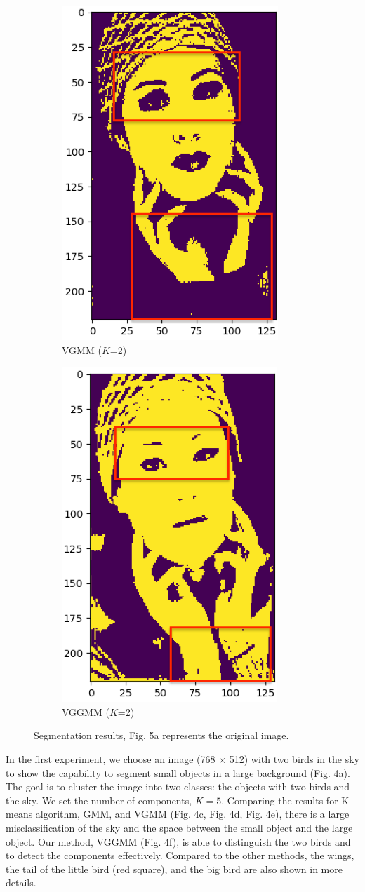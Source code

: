 \documentclass[conference]{IEEEtran}
\begin{document}
\begin{figure}
    \centering
    \begin{subfigure}{.5\linewidth}
        \centering
        \includegraphics[height=0.7\textwidth]{imgresults/face_vgm.png}
        \caption{VGMM ($K$=2)}
        \label{fig:sub1}
    \end{subfigure}%
    \begin{subfigure}{.5\linewidth}
        \centering
        \includegraphics[height=0.7\textwidth]{imgresults/face_vggmm.png}
        \caption{VGGMM ($K$=2)}
        \label{fig:sub2}
    \end{subfigure}
    \caption{Segmentation results, Fig. 5a represents the original image.}
    \label{fig:crow}
\end{figure}
In the first experiment, we choose an image (768 × 512) with two birds in the sky to show the capability to segment small objects in a large background (Fig. 4a). 
The goal is to cluster the image into two classes: the objects with two birds and the sky. 
We set the number of components, $K= 5$.
Comparing the results for K-means algorithm, GMM, and VGMM (Fig. 4c, Fig. 4d, Fig. 4e), there is a large misclassification of the sky and the space between the small object and the large object.
Our method, VGGMM (Fig. 4f), is able to distinguish the two birds and to detect the components effectively. Compared to the other methods, the wings, the tail of the little bird (red square), and the big bird are also shown in more details. 
\end{document}
